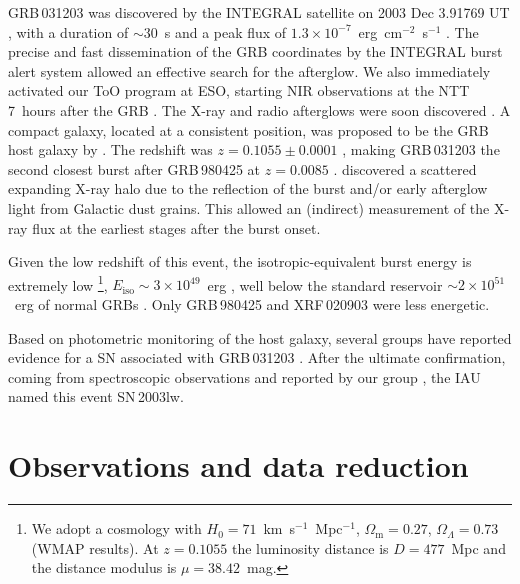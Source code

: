 \documentclass{emulateapj}
\newcommand{\ped}[2]{#1_\mathrm{#2}}
\begin{document}

GRB\,031203 was discovered by the INTEGRAL satellite on 2003 Dec 3.91769
UT \citep{Go03}, with a duration of $\sim 30$~s and a peak flux of $1.3
\times 10^{-7}$~erg~cm$^{-2}$~s$^{-1}$
\citep[$20-200$~keV;][]{Me03a}. The precise and fast dissemination of
the GRB coordinates by the INTEGRAL burst alert system \citep{Me03b}
allowed an effective search for the afterglow. We also immediately
activated our ToO program at ESO, starting NIR observations at the NTT
7~hours after the GRB \citep{Ze03}. The X-ray and radio afterglows were
soon discovered \citep{Sa03,Fr03}. A compact galaxy, located at a
consistent position,
was proposed to be the GRB host galaxy by \citet{Pr03}. The redshift was
$z = 0.1055 \pm 0.0001$ \citep{Pr03,Pr04}, making GRB\,031203 the second
closest burst after GRB\,980425 at $z = 0.0085$ \citep{Ga98}.
\citet{Va04} discovered a scattered expanding X-ray halo due to the
reflection of the burst and/or early afterglow light from Galactic dust
grains. This allowed an (indirect) measurement of the X-ray flux at the
earliest stages after the burst onset.

Given the low redshift of this event, the isotropic-equivalent burst
energy is extremely low%
\footnote{We adopt a cosmology with $H_0 = 71$~km~s$^{-1}$~Mpc$^{-1}$,
$\ped{\Omega}{m} = 0.27$, $\Omega_\Lambda = 0.73$ (WMAP results). At $z
= 0.1055$ the luminosity distance is $D =477$~Mpc and the distance
modulus is $\mu = 38.42$~mag.},
$\ped{E}{iso} \sim 3 \times 10^{49}$~erg
\citep[20-2000~keV;][]{Wa04,Pr04}, well below the standard reservoir 
$\sim 2 \times 10^{51}$~erg of normal GRBs \citep{Fr01,Bl03}. Only
GRB\,980425 \citep{Ga98} and XRF\,020903 \citep{Sa04} were less
energetic.

Based on photometric monitoring of the host galaxy, several groups have
reported evidence for a SN associated with GRB\,031203
\citep{Be04,Th04,Co04,Ga04}. After the ultimate confirmation, coming from
spectroscopic observations and reported by our group \citep{Ta04}, the
IAU named this event SN\,2003lw.


\section{Observations and data reduction}
\end{document}
